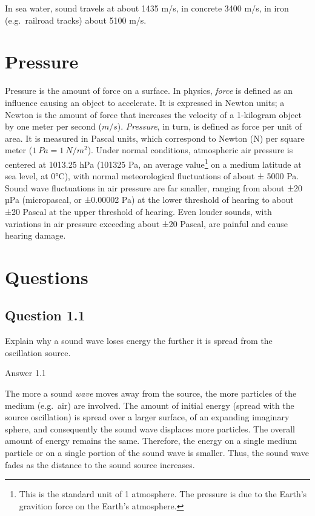 \documentclass[
]{book}
\begin{document}
In sea water, sound travels at about 1435 m/s, in concrete 3400 m/s, in iron (e.g.~railroad tracks) about 5100 m/s.

\section{Pressure}\label{sec:pressure}

Pressure is the amount of force on a surface. In physics, \emph{force} is defined as an influence causing an object to accelerate. It is expressed in Newton units; a Newton is the amount of force that increases the velocity of a 1-kilogram object by one meter per second (\(m/s\)). \emph{Pressure}, in turn, is defined as force per unit of area. It is measured in Pascal units, which correspond to Newton (N) per square meter (\(1\ Pa = 1\ N/m^2\)).
Under normal conditions, atmospheric air pressure is centered at 1013.25 hPa (101325 Pa, an average value\footnote{This is the standard unit of 1 atmosphere. The pressure is due to the Earth's gravition force on the Earth's atmosphere.} on a medium latitude at sea level, at 0°C), with normal meteorological fluctuations of about ± 5000 Pa. Sound wave fluctuations in air pressure are far smaller, ranging from about ±20 µPa (micropascal, or ±0.00002 Pa) at the lower threshold of hearing to about ±20 Pascal at the upper threshold of hearing. Even louder sounds, with variations in air pressure exceeding about ±20 Pascal, are painful and cause hearing damage.

\protect{}\label{questions-soundwaves}
\section*{Questions}\label{questions-1}

\subsection*{Question 1.1}\label{question-1.1}

Explain why a sound wave loses energy the further it is spread from the oscillation source.

Answer 1.1

The more a sound \emph{wave} moves away from the source, the more particles of the medium (e.g.~air) are involved. The amount of initial energy (spread with the source oscillation) is spread over a larger surface, of an expanding imaginary sphere, and consequently the sound wave displaces more particles. The overall amount of energy remains the same. Therefore, the energy on a single medium particle or on a single portion of the sound wave is smaller. Thus, the sound wave fades as the distance to the sound source increases.
\end{document}
